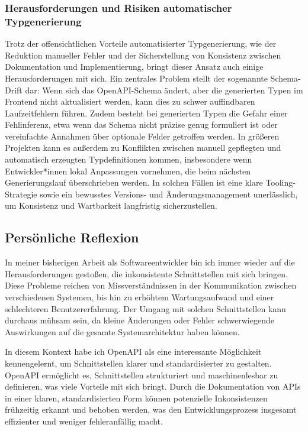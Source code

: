 \subsubsection{Herausforderungen und Risiken automatischer Typgenerierung}

Trotz der offensichtlichen Vorteile automatisierter Typgenerierung, wie der Reduktion manueller Fehler
und der Sicherstellung von Konsistenz zwischen Dokumentation und Implementierung, 
bringt dieser Ansatz auch einige Herausforderungen mit sich. 
Ein zentrales Problem stellt der sogenannte Schema-Drift dar:
Wenn sich das OpenAPI-Schema ändert, aber die generierten Typen im Frontend nicht aktualisiert werden, 
kann dies zu schwer auffindbaren Laufzeitfehlern führen. 
Zudem besteht bei generierten Typen die Gefahr einer Fehlinferenz, 
etwa wenn das Schema nicht präzise genug formuliert ist oder vereinfachte Annahmen über optionale Felder getroffen werden.
In größeren Projekten kann es außerdem zu Konflikten zwischen manuell gepflegten und automatisch erzeugten Typdefinitionen kommen,
insbesondere wenn Entwickler*innen lokal Anpassungen vornehmen, 
die beim nächsten Generierungslauf überschrieben werden. 
In solchen Fällen ist eine klare Tooling-Strategie sowie ein bewusstes Versions- und Änderungsmanagement unerlässlich, 
um Konsistenz und Wartbarkeit langfristig sicherzustellen.

\subsection{Persönliche Reflexion}

In meiner bisherigen Arbeit als Softwareentwickler bin ich immer wieder auf die Herausforderungen gestoßen,
die inkonsistente Schnittstellen mit sich bringen. 
Diese Probleme reichen von Missverständnissen in der Kommunikation zwischen verschiedenen Systemen, 
bis hin zu erhöhtem Wartungsaufwand und einer schlechteren Benutzererfahrung. 
Der Umgang mit solchen Schnittstellen kann durchaus mühsam sein, 
da kleine Änderungen oder Fehler schwerwiegende Auswirkungen auf die gesamte Systemarchitektur haben können.

In diesem Kontext habe ich OpenAPI als eine interessante Möglichkeit kennengelernt, 
um Schnittstellen klarer und standardisierter zu gestalten. 
OpenAPI ermöglicht es, Schnittstellen strukturiert und maschinenlesbar zu definieren, was viele Vorteile mit sich bringt.
Durch die Dokumentation von APIs in einer klaren, standardisierten Form können potenzielle Inkonsistenzen frühzeitig erkannt 
und behoben werden, was den Entwicklungsprozess insgesamt effizienter und weniger fehleranfällig macht.

